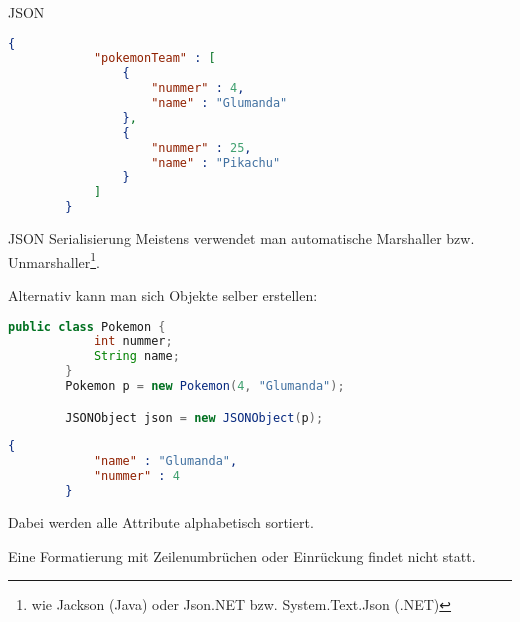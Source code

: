 \begin{example}{JSON}
    \begin{lstlisting}[language=JSON]
        {
            "pokemonTeam" : [
                {
                    "nummer" : 4,
                    "name" : "Glumanda"
                },
                {
                    "nummer" : 25,
                    "name" : "Pikachu"
                }
            ]
        }
    \end{lstlisting}
\end{example}

\begin{bonus}{JSON Serialisierung}
    Meistens verwendet man automatische Marshaller bzw. Unmarshaller\footnote{wie Jackson (Java) oder Json.NET bzw. System.Text.Json (.NET)}.
    
    Alternativ kann man sich Objekte selber erstellen:
    \begin{lstlisting}[language=java]
        public class Pokemon {
            int nummer;
            String name;
        }
        Pokemon p = new Pokemon(4, "Glumanda");

        JSONObject json = new JSONObject(p);
    \end{lstlisting}
    
    \begin{lstlisting}[language=JSON]
        {
            "name" : "Glumanda", 
            "nummer" : 4
        }
    \end{lstlisting}
    
    Dabei werden alle Attribute alphabetisch sortiert.
    
    Eine Formatierung mit Zeilenumbrüchen oder Einrückung findet nicht statt.
\end{bonus}